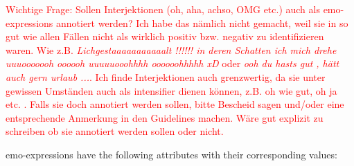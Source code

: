 \documentclass[11pt,a4paper]{article}
\begin{document}
\textcolor{red}{Wichtige Frage: Sollen Interjektionen (oh, aha, achso, OMG etc.) auch als emo-expressions annotiert werden? Ich habe das n\"amlich nicht gemacht, weil sie in so gut wie allen F\"allen nicht als wirklich positiv bzw. negativ zu identifizieren waren. Wie z.B. \textit{Lichgestaaaaaaaaaaalt !!!!!! in deren Schatten ich mich drehe uuuooooooh oooooh uuuuuooohhhh oooooohhhhh xD} oder \textit{ooh du hasts gut , h\"att auch gern urlaub ...}. Ich finde Interjektionen auch grenzwertig, da sie unter gewissen Umst\"anden auch als intensifier dienen können, z.B. oh wie gut, oh ja etc. . Falls sie doch annotiert werden sollen, bitte Bescheid sagen und/oder eine entsprechende Anmerkung in den Guidelines machen. W\"are gut explizit zu schreiben ob sie annotiert werden sollen oder nicht.}


emo-expressions have the following attributes with their corresponding values: \newline
\end{document}
